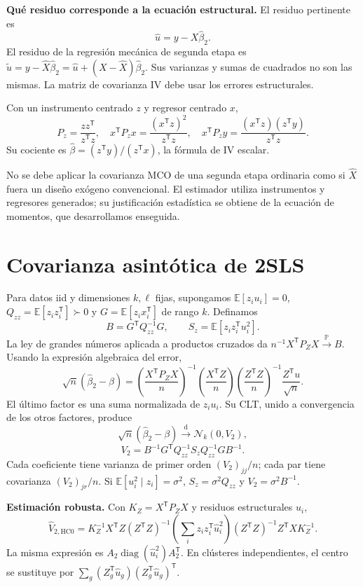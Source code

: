 \documentclass[11pt,a4paper]{article}
\newcommand{\E}{\mathbb E}
\newcommand{\Prob}{\mathbb P}
\newcommand{\T}{^{\mathsf T}}
\DeclareMathOperator{\diag}{diag}
\newcommand{\pto}{\xrightarrow{\Prob}}
\newcommand{\dto}{\xrightarrow{\mathrm d}}
\newcommand{\Normal}{\mathcal N}
\newcommand{\topic}[2]{\clearpage\section{#1}\label{#2}}
\theoremstyle{definition}\newtheorem{definicion}[teorema]{Definición}
\begin{document}
\textbf{Qué residuo corresponde a la ecuación estructural.}
El residuo pertinente es
\[
\boxed{\widehat u=y-X\widehat\beta_2}.
\]
El residuo de la regresión mecánica de segunda etapa es
$\widetilde u=y-\widehat X\widehat\beta_2
=\widehat u+(X-\widehat X)\widehat\beta_2$.
Sus varianzas y sumas de cuadrados no son las mismas.
La matriz de covarianza IV debe usar los errores estructurales.

\begin{ejemplo}
Con un instrumento centrado $z$ y regresor centrado $x$,
\[
P_z=\frac{zz\T}{z\T z},\quad
x\T P_zx=\frac{(x\T z)^2}{z\T z},\quad
x\T P_zy=\frac{(x\T z)(z\T y)}{z\T z}.
\]
Su cociente es $\widehat\beta=(z\T y)/(z\T x)$,
la fórmula de IV escalar.
\end{ejemplo}
No se debe aplicar la covarianza MCO de una segunda etapa ordinaria
como si $\widehat X$ fuera un diseño exógeno convencional.
El estimador utiliza instrumentos y regresores generados; su justificación
estadística se obtiene de la ecuación de momentos, que desarrollamos enseguida.

\topic{Covarianza asintótica de 2SLS}{s46}
Para datos iid y dimensiones $k,\ell$ fijas, supongamos
$\E[z_iu_i]=0$,
$Q_{zz}=\E[z_iz_i\T]\succ0$ y
$G=\E[z_ix_i\T]$ de rango $k$.
Definamos
\[
B=G\T Q_{zz}^{-1}G,\qquad
S_z=\E[z_iz_i\T u_i^2].
\]
La ley de grandes números aplicada a productos cruzados da
$n^{-1}X\T P_ZX\pto B$.
Usando la expresión algebraica del error,
\[
\sqrt n(\widehat\beta_2-\beta)
=\left(\frac{X\T P_ZX}{n}\right)^{-1}
\left(\frac{X\T Z}{n}\right)
\left(\frac{Z\T Z}{n}\right)^{-1}
\frac{Z\T u}{\sqrt n}.
\]
El último factor es una suma normalizada de $z_iu_i$.
Su CLT, unido a convergencia de los otros factores, produce
\[
\boxed{\sqrt n(\widehat\beta_2-\beta)
\dto\Normal_k(0,V_2)},
\]
\[
\boxed{V_2=B^{-1}G\T Q_{zz}^{-1}S_zQ_{zz}^{-1}GB^{-1}}.
\]
Cada coeficiente tiene varianza de primer orden $(V_2)_{jj}/n$;
cada par tiene covarianza $(V_2)_{jr}/n$.
Si $\E[u_i^2\mid z_i]=\sigma^2$,
$S_z=\sigma^2Q_{zz}$ y $V_2=\sigma^2B^{-1}$.

\textbf{Estimación robusta.}
Con $K_Z=X\T P_ZX$ y residuos estructurales $\widehat u_i$,
\[
\widehat V_{\mathrm{2,HC0}}
=K_Z^{-1}X\T Z(Z\T Z)^{-1}
\left(\sum_i z_iz_i\T\widehat u_i^2\right)
(Z\T Z)^{-1}Z\T XK_Z^{-1}.
\]
La misma expresión es $A_2\diag(\widehat u_i^2)A_2\T$.
En clústeres independientes, el centro se sustituye por
$\sum_g(Z_g\T\widehat u_g)(Z_g\T\widehat u_g)\T$.
\end{document}
